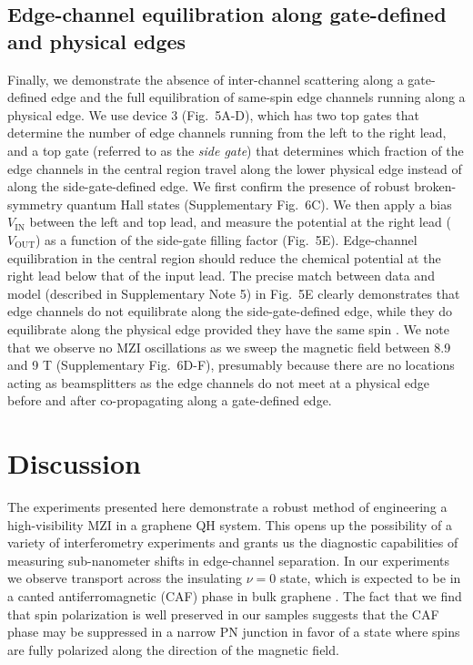 \documentclass[%
reprint,amsmath,amssymb,aps,prl,superscriptaddress,
twocolumn
]{revtex4-1}
\begin{document}
	\subsection{Edge-channel equilibration along gate-defined and physical edges}
%
	Finally, we demonstrate the absence of inter-channel scattering along a gate-defined edge and the full equilibration of same-spin edge channels running along a physical edge. We use device 3 (Fig.~5A-D), which has two top gates that determine the number of edge channels running from the left to the right lead, and a top gate (referred to as the \emph{side gate}) that determines which fraction of the edge channels in the central region travel along the lower physical edge instead of along the side-gate-defined edge. We first confirm the presence of robust broken-symmetry quantum Hall states (Supplementary Fig.~6C). We then apply a bias $V_\mathrm{IN}$ between the left and top lead, and measure the potential at the right lead ($V_\mathrm{OUT}$) as a function of the side-gate filling factor (Fig.~5E). Edge-channel equilibration in the central region should reduce the chemical potential at the right lead below that of the input lead. The precise match between data and model (described in Supplementary Note 5) in Fig.~5E clearly demonstrates that edge channels do not equilibrate along the side-gate-defined edge, while they do equilibrate along the physical edge provided they have the same spin \cite{Amet2014}. We note that we observe no MZI oscillations as we sweep the magnetic field between 8.9 and 9 T (Supplementary Fig.~6D-F), presumably because there are no locations acting as beamsplitters as the edge channels do not meet at a physical edge before and after co-propagating along a gate-defined edge.
	\section{Discussion}
	The experiments presented here demonstrate a robust method of engineering a high-visibility MZI in a graphene QH system. This opens up the possibility of a variety of interferometry experiments and grants us the diagnostic capabilities of measuring sub-nanometer shifts in edge-channel separation. In our experiments we observe transport across the insulating $\nu=0$ state, which is expected to be in a canted antiferromagnetic (CAF) phase in bulk graphene \cite{Kharitonov2012, Young2014}. The fact that we find that spin polarization is well preserved in our samples suggests that the CAF phase may be suppressed in a narrow PN junction in favor of a state where spins are fully polarized along the direction of the magnetic field. 
\end{document}
